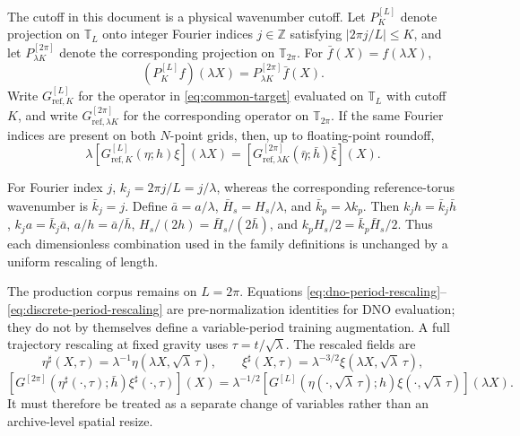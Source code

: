 \documentclass[11pt]{article}
\newcommand{\T}{\mathbb T}
\begin{document}
The cutoff in this document is a physical wavenumber cutoff.  Let
$P_K^{[L]}$ denote projection on $\T_L$ onto integer Fourier indices
$j\in\mathbb Z$ satisfying $|2\pi j/L|\leq K$, and
let $P_{\lambda K}^{[2\pi]}$ denote the corresponding projection on
$\T_{2\pi}$.  For $\bar f(X)=f(\lambda X)$,
\begin{equation}
  (P_K^{[L]}f)(\lambda X)
  =P_{\lambda K}^{[2\pi]}\bar f(X).
  \label{eq:projection-period-rescaling}
\end{equation}
Write $G_{\mathrm{ref},K}^{[L]}$ for the operator in
\eqref{eq:common-target} evaluated on $\T_L$ with cutoff $K$, and write
$G_{\mathrm{ref},\lambda K}^{[2\pi]}$ for the corresponding operator on
$\T_{2\pi}$.  If the same Fourier indices are present on both $N$-point
grids, then, up to floating-point roundoff,
\begin{equation}
  \boxed{
  \lambda
  [G_{\mathrm{ref},K}^{[L]}(\eta;h)\xi](\lambda X)
  =
  [G_{\mathrm{ref},\lambda K}^{[2\pi]}
    (\bar\eta;\bar h)\bar\xi](X).
  }
  \label{eq:discrete-period-rescaling}
\end{equation}

For Fourier index $j$, $k_j=2\pi j/L=j/\lambda$, whereas the corresponding
reference-torus wavenumber is $\bar k_j=j$.  Define
$\bar a=a/\lambda$, $\bar H_s=H_s/\lambda$, and
$\bar k_p=\lambda k_p$.  Then
$k_jh=\bar k_j\bar h$, $k_ja=\bar k_j\bar a$,
$a/h=\bar a/\bar h$, $H_s/(2h)=\bar H_s/(2\bar h)$, and
$k_pH_s/2=\bar k_p\bar H_s/2$.  Thus each dimensionless combination used in
the family definitions is unchanged by a uniform rescaling of length.

The production corpus remains on $L=2\pi$.  Equations
\eqref{eq:dno-period-rescaling}--\eqref{eq:discrete-period-rescaling} are
pre-normalization identities for DNO evaluation; they do not by themselves
define a variable-period training augmentation.  A full trajectory
rescaling at fixed gravity uses $\tau=t/\sqrt{\lambda}$.  The rescaled fields
are
\[
  \eta^\sharp(X,\tau)
    =\lambda^{-1}\eta(\lambda X,\sqrt\lambda\,\tau),\qquad
  \xi^\sharp(X,\tau)
    =\lambda^{-3/2}\xi(\lambda X,\sqrt\lambda\,\tau),
\]
\[
  [G^{[2\pi]}(\eta^\sharp(\cdot,\tau);\bar h)
       \xi^\sharp(\cdot,\tau)](X)
  =\lambda^{-1/2}
    [G^{[L]}(\eta(\cdot,\sqrt\lambda\,\tau);h)
       \xi(\cdot,\sqrt\lambda\,\tau)](\lambda X).
\]
It must therefore be treated as a separate change of variables rather than
an archive-level spatial resize.
\end{document}
